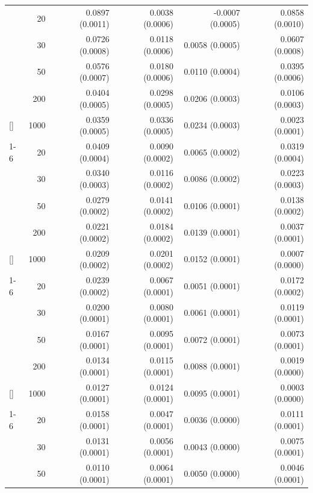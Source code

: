 \documentclass[
  nonatbib,
  authoryear,
  preprint]{elsarticle}
\begin{document}
\begin{longtable}[t]{lrrrrr}
\endfoot
\bottomrule
\endlastfoot
 & 20 & 0.0897 (0.0011) & 0.0038 (0.0006) & -0.0007 (0.0005) & 0.0858 (0.0010)\\
\nopagebreak
 & 30 & 0.0726 (0.0008) & 0.0118 (0.0006) & 0.0058 (0.0005) & 0.0607 (0.0008)\\
\nopagebreak
 & 50 & 0.0576 (0.0007) & 0.0180 (0.0006) & 0.0110 (0.0004) & 0.0395 (0.0006)\\
\nopagebreak
 & 200 & 0.0404 (0.0005) & 0.0298 (0.0005) & 0.0206 (0.0003) & 0.0106 (0.0003)\\
\nopagebreak
\multirow[t]{-4}{*}[\normalbaselineskip]{\raggedright\arraybackslash 5} & 1000 & 0.0359 (0.0005) & 0.0336 (0.0005) & 0.0234 (0.0003) & 0.0023 (0.0001)\\
\cmidrule{1-6}\pagebreak[0]
 & 20 & 0.0409 (0.0004) & 0.0090 (0.0002) & 0.0065 (0.0002) & 0.0319 (0.0004)\\
\nopagebreak
 & 30 & 0.0340 (0.0003) & 0.0116 (0.0002) & 0.0086 (0.0002) & 0.0223 (0.0003)\\
\nopagebreak
 & 50 & 0.0279 (0.0002) & 0.0141 (0.0002) & 0.0106 (0.0001) & 0.0138 (0.0002)\\
\nopagebreak
 & 200 & 0.0221 (0.0002) & 0.0184 (0.0002) & 0.0139 (0.0001) & 0.0037 (0.0001)\\
\nopagebreak
\multirow[t]{-4}{*}[\normalbaselineskip]{\raggedright\arraybackslash 10} & 1000 & 0.0209 (0.0002) & 0.0201 (0.0002) & 0.0152 (0.0001) & 0.0007 (0.0000)\\
\cmidrule{1-6}\pagebreak[0]
 & 20 & 0.0239 (0.0002) & 0.0067 (0.0001) & 0.0051 (0.0001) & 0.0172 (0.0002)\\
\nopagebreak
 & 30 & 0.0200 (0.0001) & 0.0080 (0.0001) & 0.0061 (0.0001) & 0.0119 (0.0001)\\
\nopagebreak
 & 50 & 0.0167 (0.0001) & 0.0095 (0.0001) & 0.0072 (0.0001) & 0.0073 (0.0001)\\
\nopagebreak
 & 200 & 0.0134 (0.0001) & 0.0115 (0.0001) & 0.0088 (0.0001) & 0.0019 (0.0000)\\
\nopagebreak
\multirow[t]{-4}{*}[\normalbaselineskip]{\raggedright\arraybackslash 15} & 1000 & 0.0127 (0.0001) & 0.0124 (0.0001) & 0.0095 (0.0001) & 0.0003 (0.0000)\\
\cmidrule{1-6}\pagebreak[0]
 & 20 & 0.0158 (0.0001) & 0.0047 (0.0001) & 0.0036 (0.0000) & 0.0111 (0.0001)\\
\nopagebreak
 & 30 & 0.0131 (0.0001) & 0.0056 (0.0001) & 0.0043 (0.0000) & 0.0075 (0.0001)\\
\nopagebreak
 & 50 & 0.0110 (0.0001) & 0.0064 (0.0001) & 0.0050 (0.0000) & 0.0046 (0.0001)\\

\end{longtable}
\end{document}
